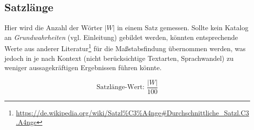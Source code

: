\documentclass[10pt,a4paper]{article}
\begin{document}
	\subsection*{Satzlänge}
	Hier wird die Anzahl der Wörter $ |W| $ in einem Satz gemessen. Sollte kein Katalog an \textit{Grundwahrheiten} (vgl. Einleitung) gebildet werden, könnten entsprechende Werte aus anderer Literatur\footnote{\url{https://de.wikipedia.org/wiki/Satzl\%C3\%A4nge\#Durchschnittliche_Satzl.C3.A4nge}} für die Maßstabsfindung übernommen werden, was jedoch in je nach Kontext (nicht berücksichtige Textarten, Sprachwandel) zu weniger aussagekräftigen Ergebnissen führen könnte.
		
	\begin{equation*}
		\text{Satzlänge-Wert: }\frac{|W|}{100}
	\end{equation*}	
	
\end{document}
